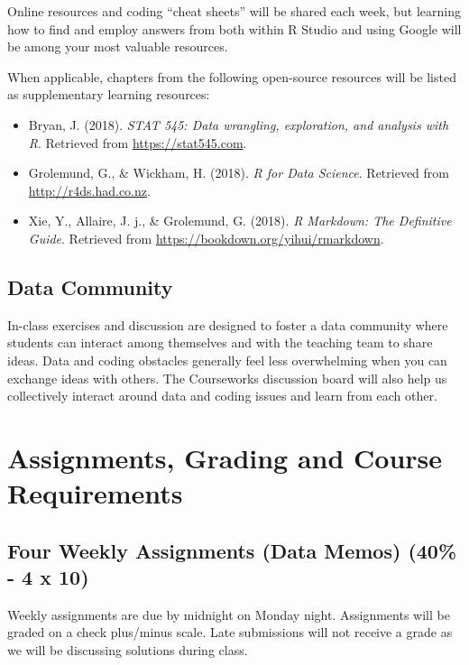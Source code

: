 \documentclass[11pt,]{article}
\providecommand{\tightlist}{%
  \setlength{\itemsep}{0pt}\setlength{\parskip}{0pt}}
\begin{document}
Online resources and coding ``cheat sheets'' will be shared each week,
but learning how to find and employ answers from both within R Studio
and using Google will be among your most valuable resources.

When applicable, chapters from the following open-source resources will
be listed as supplementary learning resources:

\begin{itemize}
\tightlist
\item
  Bryan, J. (2018). \emph{STAT 545: Data wrangling, exploration, and
  analysis with R}. Retrieved from \url{https://stat545.com}.
\item
  Grolemund, G., \& Wickham, H. (2018). \emph{R for Data Science}.
  Retrieved from \url{http://r4ds.had.co.nz}.
\item
  Xie, Y., Allaire, J. j., \& Grolemund, G. (2018). \emph{R Markdown:
  The Definitive Guide}. Retrieved from
  \url{https://bookdown.org/yihui/rmarkdown}.
\end{itemize}

\hypertarget{data-community}{%
\subsection{Data Community}\label{data-community}}

In-class exercises and discussion are designed to foster a data
community where students can interact among themselves and with the
teaching team to share ideas. Data and coding obstacles generally feel
less overwhelming when you can exchange ideas with others. The
Courseworks discussion board will also help us collectively interact
around data and coding issues and learn from each other.

\hypertarget{assignments-grading-and-course-requirements}{%
\section{Assignments, Grading and Course
Requirements}\label{assignments-grading-and-course-requirements}}

\hypertarget{four-weekly-assignments-data-memos-40---4-x-10}{%
\subsection{Four Weekly Assignments (Data Memos) (40\% - 4 x
10)}\label{four-weekly-assignments-data-memos-40---4-x-10}}

Weekly assignments are due by midnight on Monday night. Assignments will
be graded on a check plus/minus scale. Late submissions will not receive
a grade as we will be discussing solutions during class.
\end{document}
